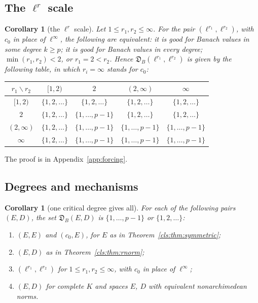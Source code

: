 \documentclass[11pt]{amsart}
\newtheorem{corollary}[theorem]{Corollary}
\theoremstyle{definition}
\theoremstyle{remark}
\numberwithin{equation}{section}
\theoremstyle{plain}
\theoremstyle{definition}
\theoremstyle{plain}
\newcommand{\fD}{\mathfrak D}
\begin{document}
\subsection{The \texorpdfstring{$\ell^r$}{l\textasciicircum r} scale}

\begin{corollary}[the $\ell^r$ scale]\label{cls:cor:lr-table}
Let $1\le r_1,r_2\le\infty$. For the pair $(\ell^{r_1},\ell^{r_2})$, with $c_0$ in place of $\ell^\infty$, the following
are equivalent: it is good for Banach values in some degree $k\ge p$; it is good for Banach values in every degree;
$\min(r_1,r_2)<2$, or $r_1=2<r_2$. Hence $\fD_B(\ell^{r_1},\ell^{r_2})$ is given by the following table, in which $r_i=\infty$ stands
for $c_0$:
\begin{center}
\small
\begin{tabular}{c|cccc}
$r_1\backslash r_2$ & $[1,2)$ & $2$ & $(2,\infty)$ & $\infty$\\ \hline
$[1,2)$ & $\{1,2,\dots\}$ & $\{1,2,\dots\}$ & $\{1,2,\dots\}$ & $\{1,2,\dots\}$\\
$2$ & $\{1,2,\dots\}$ & $\{1,\dots,p-1\}$ & $\{1,2,\dots\}$ & $\{1,2,\dots\}$\\
$(2,\infty)$ & $\{1,2,\dots\}$ & $\{1,\dots,p-1\}$ & $\{1,\dots,p-1\}$ & $\{1,\dots,p-1\}$\\
$\infty$ & $\{1,2,\dots\}$ & $\{1,\dots,p-1\}$ & $\{1,\dots,p-1\}$ & $\{1,\dots,p-1\}$
\end{tabular}
\end{center}
\end{corollary}

The proof is in Appendix~\ref{app:forcing}.

\subsection{Degrees and mechanisms}

\begin{corollary}[one critical degree gives all]\label{cls:cor:dichotomy}
For each of the following pairs $(E,D)$, the set $\fD_B(E,D)$ is $\{1,\dots,p-1\}$ or $\{1,2,\dots\}$:
\begin{enumerate}
\item $(E,E)$ and $(c_0,E)$, for $E$ as in Theorem~\ref{cls:thm:symmetric};
\item $(E,D)$ as in Theorem~\ref{cls:thm:rnorm};
\item $(\ell^{r_1},\ell^{r_2})$ for $1\le r_1,r_2\le\infty$, with $c_0$ in place of $\ell^\infty$;
\item $(E,D)$ for complete $K$ and spaces $E$, $D$ with equivalent nonarchimedean norms.
\end{enumerate}
\end{corollary}
\end{document}
